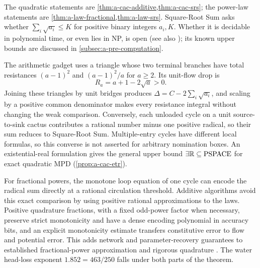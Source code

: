The quadratic statements are \cref{thm:a-cac-additive,thm:a-cac-srs};
the power-law statements are \cref{thm:a-law-fractional,thm:a-law-srs}.
Square-Root Sum asks whether $\sum_i\sqrt{a_i}\le K$ for positive
binary integers $a_i,K$. Whether it is decidable in polynomial time, or
even lies in NP, is open (see also \citet[Section 5]{ajdarow2025-taming});
its known upper bounds are discussed in \cref{subsec:a-pre-computation}.

The arithmetic gadget uses a triangle whose two terminal branches have
total resistances $(a-1)^2$ and $(a-1)^2/a$ for $a\ge2$. Its unit-flow
drop is
\[
 R_a=a+1-2\sqrt a>0.
\]
Joining these triangles by unit bridges produces
$\Delta=C-2\sum_i\sqrt{a_i}$, and scaling by a positive common
denominator makes every resistance integral without changing the weak
comparison. Conversely, each unloaded cycle on a unit source-to-sink
cactus contributes a rational number minus one positive radical, so
their sum reduces to Square-Root Sum. Multiple-entry cycles have
different local formulas, so this converse is not asserted for arbitrary
nomination boxes. An existential-real formulation gives the general
upper bound $\exists\mathbb{R}\subseteq\mathrm{PSPACE}$ for exact quadratic MPD
(\cref{prop:a-cac-etr}).

For fractional powers, the monotone loop equation of one cycle can
encode the radical sum directly at a rational circulation threshold.
Additive algorithms avoid this exact comparison by using positive
rational approximations to the laws. Positive quadrature fractions,
with a fixed odd-power factor when necessary, preserve strict
monotonicity and have a dense encoding polynomial in accuracy bits, and
an explicit monotonicity estimate transfers constitutive error to flow
and potential error. This adds network and parameter-recovery guarantees
to established fractional-power approximation
\citep{bonito2015-numerical-approximation-of-fractional-powers} and
rigorous quadrature \citep{johansson2018-gauss-legendre}. The water
head-loss exponent $1.852=463/250$
\citep[Example 2.3]{gro2017-algorithmic-results-for-potential-based}
falls under both parts of the theorem.
